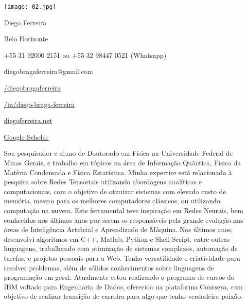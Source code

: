 \documentclass[a4paper,10pt]{article}
\newlength{\cvcolumngapwidth}
\newlength{\cvleftcolumnwidth}
\newlength{\cvrightcolumnwidth}
\newcommand{\cvnamestyle}[1]{{\Large\cvnamefont\textcolor{cvnamecolor}{#1}}}
\newlength{\cvafteritemskipamount}
\newlength{\cvafternameskipamount}
\newlength{\cvafterpersonalinfolineskipamount}
\newcommand{\cvpersonalinfo}[2]{
    \begin{minipage}[t]{\cvleftcolumnwidth}
        \vspace{0mm} %
        \raggedleft #1
    \end{minipage}%
    \hspace{\cvcolumngapwidth}%
    \begin{minipage}[t]{\cvrightcolumnwidth}
        \vspace{0mm} %
        #2
    \end{minipage}
    \vspace{\cvafteritemskipamount}}
\newcommand{\cvname}[1]{
    \cvnamestyle{#1}
    \vspace{\cvafternameskipamount}}
\newcommand{\cvpersonalinfolinewithicon}[3]{
    \raisebox{.5\fontcharht\font`E-.5\height}{\texttt{[image: \#2]}}
    #3
    \vspace{\cvafterpersonalinfolineskipamount}}
\begin{document}
\cvpersonalinfo{\texttt{[image: 02.jpg]}} %
    {\cvname{Diego Ferreira}
    
    \cvpersonalinfolinewithicon{height=4.5mm}{globe.png}{Belo Horizonte} %
    
    \cvpersonalinfolinewithicon{height=4.5mm}{phone.png}{+55 31 92000 2151 ou +55 32 98447 0521 (Whatsapp)} %
    
    \cvpersonalinfolinewithicon{height=4.5mm}{envelope.png}{diegobragaferreira@gmail.com} %
        
    \cvpersonalinfolinewithicon{height=4.5mm}{github.png}{\href{https://github.com/diegobragaferreira}{/diegobragaferreira}}
    
    \cvpersonalinfolinewithicon{height=4.5mm}{linkedin.png}{\href{https://linkedin.com/in/diego-braga-ferreira}{/in/diego-braga-ferreira}}
    
    \cvpersonalinfolinewithicon{height=4.5mm}{website.png}{\href{https://diegoferreira.net}{diegoferreira.net}}
    
    \cvpersonalinfolinewithicon{height=4.5mm}{scholar.png}{\href{https://scholar.google.com/citations?user=6i7I6wUAAAAJ}{Google Scholar}}
    
    \vspace{0.4cm}
    \cvpersonalinfolinewithicon{height=4.5mm}{comment.png}{
    Sou pesquisador e aluno de Doutorado em Física na Universidade Federal de Minas Gerais, 
    e trabalho em tópicos na área de Informação Quântica, Física da Matéria Condensada e Física Estatística. 
    Minha expertise está relacionada à pesquisa sobre Redes Tensoriais utilizando abordagens analíticas e computacionais, 
    com o objetivo de otimizar sistemas com elevado custo de memória, mesmo para os melhores computadores clássicos, ou utilizando computação na nuvem. 
    Este ferramental teve inspiração em Redes Neurais, bem conhecidos nos últimos anos por serem os responsáveis pela grande evolução nas áreas de 
    Inteligência Artificial e Aprendizado de Máquina.
    \newline\newline
    Nos últimos anos, desenvolvi algoritmos em C++, Matlab, Python e Shell Script, entre outras linguagens, trabalhando com otimização 
    de sistemas complexos, automação de tarefas, e projetos pessoais para a Web.
    \newline\newline
    Tenho versatilidade e criatividade para resolver problemas, além de sólidos conhecimentos sobre linguagens de programação em geral.
    \newline\newline    
    Atualmente estou realizando o programa de cursos da IBM voltado para Engenharia de Dados, oferecido na plataforma Coursera, 
    com objetivo de realizar transição de carreira para algo que tenho verdadeira paixão.
    }}
    
\end{document}
